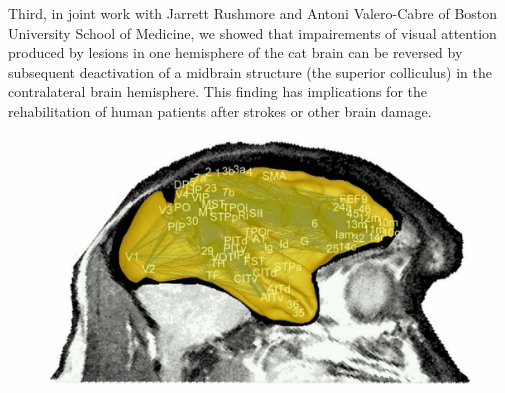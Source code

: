Third, in joint work with Jarrett Rushmore and Antoni Valero-Cabre of Boston University School of Medicine, we showed that impairements of visual attention produced by lesions in one hemisphere of the cat brain can be reversed by subsequent deactivation of a midbrain structure (the superior colliculus) in the contralateral brain hemisphere. This finding has implications for the rehabilitation of human patients after strokes or other brain damage.


\begin{figure}[ht]
  \begin{center}
    \includegraphics[width=\hsize]{Hilgetag/Hilgetag_2005_fig.pdf}
    \label{fig:Hilgetag_2005_fig}
  \end{center}
\end{figure}


